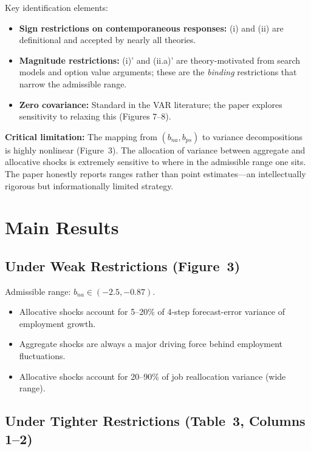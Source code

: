 Key identification elements:
\begin{itemize}
  \item \textbf{Sign restrictions on contemporaneous responses:} (i) and (ii)
    are definitional and accepted by nearly all theories.
  \item \textbf{Magnitude restrictions:} (i)' and (ii.a)' are theory-motivated
    from search models and option value arguments; these are the \emph{binding}
    restrictions that narrow the admissible range.
  \item \textbf{Zero covariance:} Standard in the VAR literature; the paper
    explores sensitivity to relaxing this (Figures 7--8).
\end{itemize}

\textbf{Critical limitation:} The mapping from $(b_{na}, b_{ps})$ to variance
decompositions is highly nonlinear (Figure~3). The allocation of variance
between aggregate and allocative shocks is extremely sensitive to where in the
admissible range one sits. The paper honestly reports ranges rather than point
estimates---an intellectually rigorous but informationally limited strategy.

\section{Main Results}

\subsection*{Under Weak Restrictions (Figure~3)}

Admissible range: $b_{na}\in(-2.5,-0.87)$.
\begin{itemize}
  \item Allocative shocks account for 5--20\% of 4-step forecast-error
    variance of employment growth.
  \item Aggregate shocks are always a major driving force behind employment
    fluctuations.
  \item Allocative shocks account for 20--90\% of job reallocation variance
    (wide range).
\end{itemize}

\subsection*{Under Tighter Restrictions (Table~3, Columns 1--2)}

